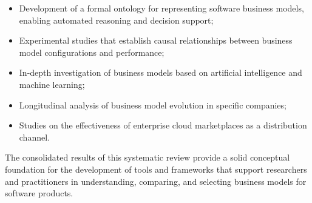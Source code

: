 \documentclass[journal]{IEEEtran}
\begin{document}
\begin{itemize}
    \item Development of a formal ontology for representing software business models, enabling automated reasoning and decision support;

    \item Experimental studies that establish causal relationships between business model configurations and performance;

    \item In-depth investigation of business models based on artificial intelligence and machine learning;

    \item Longitudinal analysis of business model evolution in specific companies;

    \item Studies on the effectiveness of enterprise cloud marketplaces as a distribution channel.
\end{itemize}

The consolidated results of this systematic review provide a solid conceptual foundation for the development of tools and frameworks that support researchers and practitioners in understanding, comparing, and selecting business models for software products.

%
%

\end{document}
